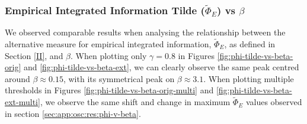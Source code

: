 \documentclass[a4paper,11pt]{article}
\begin{document}
\subsubsection{Empirical Integrated Information Tilde ($\widetilde{\Phi}_{E}$) vs $\beta$}
\label{sec:app:osc:res:phi-tilde-v-beta}

We observed comparable results when analysing the relationship between the alternative measure for empirical integrated information, $\widetilde{\Phi}_{E}$, as defined in Section \ref{II}, and $\beta$. When plotting only $\gamma = 0.8$ in Figures \ref{fig:phi-tilde-vs-beta-orig} and \ref{fig:phi-tilde-vs-beta-ext}, we can clearly observe the same peak centred around $\beta \approx 0.15$, with its symmetrical peak on $\beta \approx 3.1$. When plotting multiple thresholds in Figures \ref{fig:phi-tilde-vs-beta-orig-multi} and \ref{fig:phi-tilde-vs-beta-ext-multi}, we observe the same shift and change in maximum $\widetilde{\Phi}_{E}$ values observed in section \ref{sec:app:osc:res:phi-v-beta}.
\end{document}
